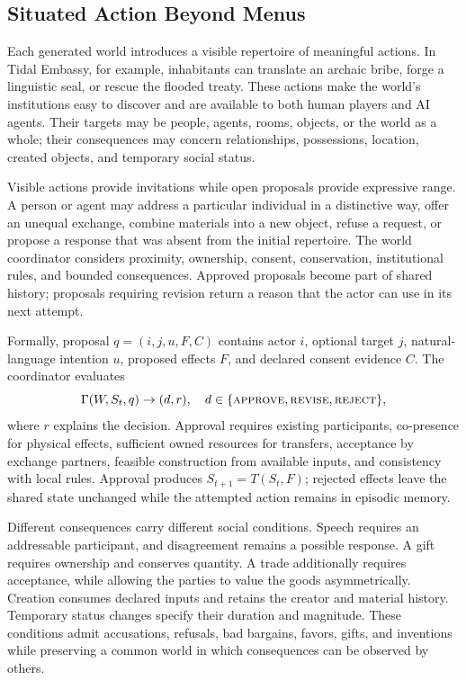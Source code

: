\documentclass[10pt,twocolumn]{article}
\begin{document}
\subsection{Situated Action Beyond Menus}

Each generated world introduces a visible repertoire of meaningful actions.
In Tidal Embassy, for example, inhabitants can translate an archaic bribe,
forge a linguistic seal, or rescue the flooded treaty. These actions make the
world's institutions easy to discover and are available to both human players
and AI agents. Their targets may be people, agents, rooms, objects, or the world
as a whole; their consequences may concern relationships, possessions,
location, created objects, and temporary social status.

Visible actions provide invitations while open proposals provide expressive
range. A person or agent may address a particular individual in a distinctive
way, offer an unequal exchange, combine materials into a new object, refuse a
request, or propose a response that was absent from the initial repertoire.
The world coordinator considers proximity, ownership, consent, conservation,
institutional rules, and bounded consequences. Approved proposals become part
of shared history; proposals requiring revision return a reason that the actor
can use in its next attempt.

Formally, proposal $q=(i,j,u,F,C)$ contains actor $i$, optional target $j$,
natural-language intention $u$, proposed effects $F$, and declared consent
evidence $C$. The coordinator evaluates
\[
\Gamma(W,S_t,q) \rightarrow (d,r),
\quad d\in\{\textsc{approve},\textsc{revise},\textsc{reject}\},
\]
where $r$ explains the decision. Approval requires existing participants,
co-presence for physical effects, sufficient owned resources for transfers,
acceptance by exchange partners, feasible construction from available inputs,
and consistency with local rules. Approval produces $S_{t+1}=T(S_t,F)$;
rejected effects leave the shared state unchanged while the attempted action
remains in episodic memory.

Different consequences carry different social conditions. Speech requires an
addressable participant, and disagreement remains a possible response. A gift
requires ownership and conserves quantity. A trade additionally requires
acceptance, while allowing the parties to value the goods asymmetrically.
Creation consumes declared inputs and retains the creator and material history.
Temporary status changes specify their duration and magnitude. These conditions
admit accusations, refusals, bad bargains, favors, gifts, and inventions while
preserving a common world in which consequences can be observed by others.
\end{document}
